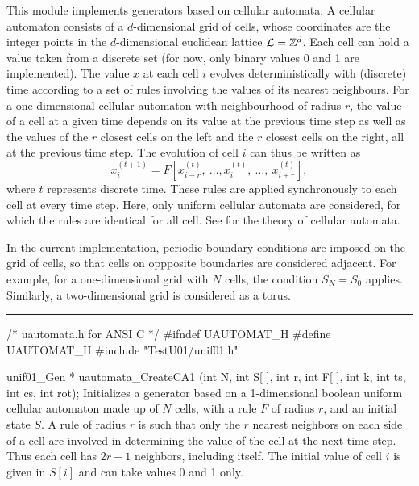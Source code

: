 
This module implements generators based on cellular automata. A cellular
automaton consists of a $d$-dimensional grid of cells, whose coordinates are 
the integer points in the \mbox{$d$-dimensional} euclidean lattice
 ${\cal L} = \mathbb{Z}^d$. Each cell can hold a value taken from a discrete
 set (for now, only binary values 0 and 1 are implemented).
The value $x$ at each cell $i$ evolves deterministically with (discrete)
 time according
to a set of rules involving the values of its nearest neighbours. For a 
one-dimensional cellular automaton with neighbourhood of radius $r$, the value
 of a cell at a given time depends on its value at the previous time
 step  as well as the values of the $r$ closest cells on
 the left and  the $r$ closest cells on the right, all at the previous time
 step. The evolution of cell $i$ can thus be written as
$$
   x_i^{(t+1)} = F\left[ x_{i-r}^{(t)},\ \ldots, x_{i}^{(t)},\  \ldots,
                 \ x_{i+r}^{(t)}\right],
$$
where $t$ represents discrete time.
These rules are applied synchronously to each cell at every time step.
Here, only uniform cellular automata are considered, for which the rules 
are identical for all cell.
See \cite{rWOL86a,rWOL86b,rTOM99a}
for the theory of  cellular automata.

In the current implementation,
periodic boundary conditions are imposed on the grid of cells, so that
 cells on oppposite boundaries are considered adjacent. For example, for a
one-dimensional grid with $N$ cells, the condition $S_N = S_0$ applies.
Similarly, a two-dimensional grid is considered as a torus.



\bigskip
\hrule
\code\hide
/* uautomata.h for ANSI C */
#ifndef UAUTOMAT_H
#define UAUTOMAT_H
\endhide
#include "TestU01/unif01.h"

unif01_Gen * uautomata_CreateCA1 (int N, int S[ ], int r, int F[ ],
                                  int k, int ts, int cs, int rot);
\endcode
  \tab  Initializes a generator based on a 1-dimensional boolean uniform
 cellular automaton made up of $N$ cells, with a rule $F$ of radius $r$,
 and an initial state $S$. A rule of radius $r$ is such that only the $r$ 
 nearest neighbors on each side of a cell are involved in determining the
 value of the cell at the next time step. Thus each cell has $2r+1$ 
 neighbors, including itself. 
 The initial value of cell $i$ is given in $S[i]$ and can take
%
 values 0 and 1 only.

